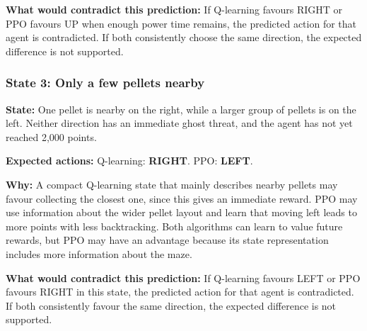 \textbf{What would contradict this prediction:} If Q-learning favours RIGHT or PPO favours UP when enough power time remains, the predicted action for that agent is contradicted. If both consistently choose the same direction, the expected difference is not supported.

\subsubsection{State 3: Only a few pellets nearby}
\textbf{State:} One pellet is nearby on the right, while a larger group of pellets is on the left. Neither direction has an immediate ghost threat, and the agent has not yet reached 2,000 points.

\textbf{Expected actions:} Q-learning: \textbf{RIGHT}. PPO: \textbf{LEFT}.

\textbf{Why:} A compact Q-learning state that mainly describes nearby pellets may favour collecting the closest one, since this gives an immediate reward. PPO may use information about the wider pellet layout and learn that moving left leads to more points with less backtracking. Both algorithms can learn to value future rewards, but PPO may have an advantage because its state representation includes more information about the maze.

\textbf{What would contradict this prediction:} If Q-learning favours LEFT or PPO favours RIGHT in this state, the predicted action for that agent is contradicted. If both consistently favour the same direction, the expected difference is not supported.
